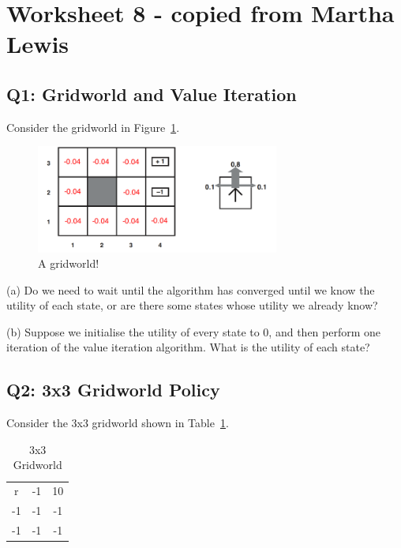 \documentclass[11pt,a4paper]{scrartcl}
\begin{document}
\section*{Worksheet 8 - copied from Martha Lewis}

\subsection*{Q1: Gridworld and Value Iteration}

Consider the gridworld in Figure~\ref{fig:gridworld}.

\begin{figure}[h]
  \begin{center}
    \includegraphics[width=8cm]{gridworld.png}
  \end{center}
  \caption{A gridworld! \label{fig:gridworld}}
  \end{figure}

(a) Do we need to wait until the algorithm has converged until we know the utility of each state, or are there some states whose utility we already know?

(b) Suppose we initialise the utility of every state to 0, and then perform one iteration of the value iteration algorithm. What is the utility of each state?

\subsection*{Q2: 3x3 Gridworld Policy}

Consider the 3x3 gridworld shown in Table~\ref{tab:gridworld}.

\begin{table}[h]
    \centering
    \begin{tabular}{ccc}
        \toprule
        r & -1 & 10 \\
        -1 & -1 & -1 \\
        -1 & -1 & -1 \\
        \bottomrule
    \end{tabular}
    \caption{3x3 Gridworld}
    \label{tab:gridworld}
\end{table}
\end{document}
